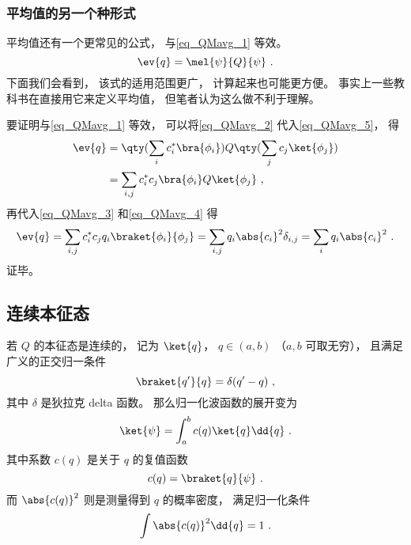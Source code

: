 \subsubsection{平均值的另一个种形式}
平均值还有一个更常见的公式， 与\autoref{eq_QMavg_1} 等效。
\begin{equation}\label{eq_QMavg_5}
\ev{q} = \mel{\psi}{Q}{\psi}~.
\end{equation}
下面我们会看到， 该式的适用范围更广， 计算起来也可能更方便。 事实上一些教科书在直接用它来定义平均值， 但笔者认为这么做不利于理解。

要证明与\autoref{eq_QMavg_1} 等效， 可以将\autoref{eq_QMavg_2} 代入\autoref{eq_QMavg_5}， 得
\begin{equation}
\begin{aligned}
\ev{q} &= \qty(\sum_i c_i^* \bra{\phi_i}) Q \qty(\sum_j c_j \ket{\phi_j})\\
&= \sum_{i,j} c_i^* c_j \bra{\phi_i} Q \ket{\phi_j}~,
\end{aligned} 
\end{equation}
再代入\autoref{eq_QMavg_3} 和\autoref{eq_QMavg_4} 得
\begin{equation}
\ev{q} = \sum_{i,j} c_i^* c_j q_i \braket{\phi_i}{\phi_j}
= \sum_{i,j} q_i \abs{c_i}^2 \delta_{i,j} = \sum_i q_i \abs{c_i}^2~.
\end{equation}
证毕。

\subsection{连续本征态}

若 $Q$ 的本征态是连续的， 记为 $\ket{q}$， $q\in (a,b)$ （$a,b$ 可取无穷）， 且满足广义的正交归一条件
\begin{equation}\label{eq_QMavg_9}
\braket{q'}{q} = \delta(q'-q)~,
\end{equation}
其中 $\delta$ 是狄拉克 delta 函数。 那么归一化波函数的展开变为
\begin{equation}\label{eq_QMavg_7}
\ket{\psi} = \int_a^b c(q) \ket{q} \dd{q}~.
\end{equation}
其中系数 $c(q)$ 是关于 $q$ 的复值函数
\begin{equation}\label{eq_QMavg_10}
c(q) = \braket{q}{\psi}~.
\end{equation}
而 $\abs{c(q)}^2$ 则是测量得到 $q$ 的概率密度， 满足归一化条件
\begin{equation}
\int \abs{c(q)}^2 \dd{q} = 1~.
\end{equation}

